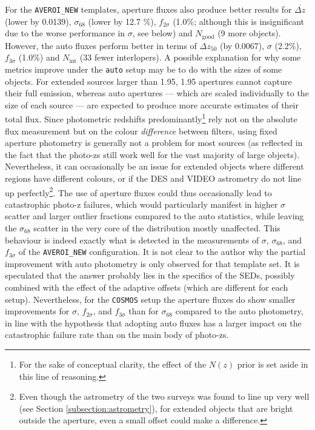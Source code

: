 For the \texttt{AVEROI\_NEW} templates, aperture fluxes also produce better results for $\overbar{\Delta z}$ (lower by 0.0139), $\sigma_{68}$ (lower by 12.7 \%), $f_{2\sigma}$ (1.0\%; although this is insignificant due to the worse performance in $\sigma$, see below) and $N_{\mathrm{good}}$ (9 more objects). However, the auto fluxes perform better in terms of $\Delta z_{50}$ (by 0.0067), $\sigma$ (2.2\%), $f_{3\sigma}$ (1.0\%) and $N_{\mathrm{int}}$ (33 fewer interlopers). A possible explanation for why some metrics improve under the \texttt{auto} setup may be to do with the sizes of some objects. For extended sources larger than \SI{1.95}{\arcsec}, \SI{1.95}{\arcsec} apertures cannot capture their full emission, whereas auto apertures --- which are scaled individually to the size of each source --- are expected to produce more accurate estimates of their total flux. Since photometric redshifts predominantly\footnote{For the sake of conceptual clarity, the effect of the $N(z)$ prior is set aside in this line of reasoning.} rely not on the absolute flux measurement but on the colour \textit{difference} between filters, using fixed aperture photometry is generally not a problem for most sources (as reflected in the fact that the photo-zs still work well for the vast majority of large objects). Nevertheless, it can occasionally be an issue for extended objects where different regions have different colours, or if the DES and VIDEO astrometry do not line up perfectly\footnote{Even though the astrometry of the two surveys was found to line up very well (see Section \ref{subsection:astrometry}), for extended objects that are bright outside the aperture, even a small offset could make a difference.}. The use of aperture fluxes could thus occasionally lead to catastrophic photo-z failures, which would particularly manifest in higher $\sigma$ scatter and larger outlier fractions compared to the auto statistics, while leaving the $\sigma_{68}$ scatter in the very core of the distribution mostly unaffected. This behaviour is indeed exactly what is detected in the measurements of $\sigma$, $\sigma_{68}$, and $f_{3\sigma}$ of the \texttt{AVEROI\_NEW} configuration. It is not clear to the author why the partial improvement with auto photometry is only observed for that template set. It is speculated that the answer probably lies in the specifics of the SEDs, possibly combined with the effect of the adaptive offsets (which are different for each setup). Nevertheless, for the \texttt{COSMOS} setup the aperture fluxes do show smaller improvements for $\sigma$, $f_{2\sigma}$, and $f_{3\sigma}$ than for $\sigma_{68}$ compared to the auto photometry, in line with the hypothesis that adopting auto fluxes has a larger impact on the catastrophic failure rate than on the main body of photo-zs. \par


